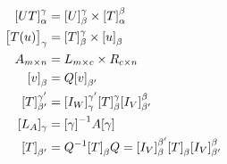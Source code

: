 \begin{example}
    
\begin{equation*}
    \begin{aligned}
        \coordinate{UT}_{\alpha}^{\gamma} &= \coordinate{U}_{\beta}^{\gamma} \times \coordinate{T}_{\alpha}^{\beta} \\
        \coordinate{T(u)}_\gamma &= \coordinate{T}_{\beta}^{\gamma} \times \coordinate{u}_{\beta} \\
        A_{m \times n} &= L_{m \times c} \times R_{c \times n} \\
        \coordinate{v}_\beta &= Q \coordinate{v}_{\beta^\prime} \\
        \coordinate{T}_{\beta^\prime}^{\gamma^\prime} &= \coordinate{I_W}_\gamma^{\gamma^\prime} \coordinate{T}_\beta^\gamma \coordinate{I_V}_{\beta^\prime}^\beta \\
        [L_A]_\gamma &= \inverse{[\gamma]} A [\gamma] \\
        \coordinate{T}_{\beta^\prime} &= \inverse{Q} \coordinate{T}_{\beta} Q = \coordinate{I_V}_\beta^{\beta^\prime} \coordinate{T}_\beta \coordinate{I_V}_{\beta^\prime}^\beta
    \end{aligned}
\end{equation*}

\end{example}

